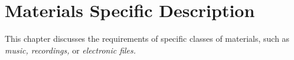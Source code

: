 
\chapter{Materials Specific Description}
\label{cha:smd}

This chapter discusses the requirements of specific classes of
materials, such as \textit{music, recordings,} or \textit{electronic
  files.}


